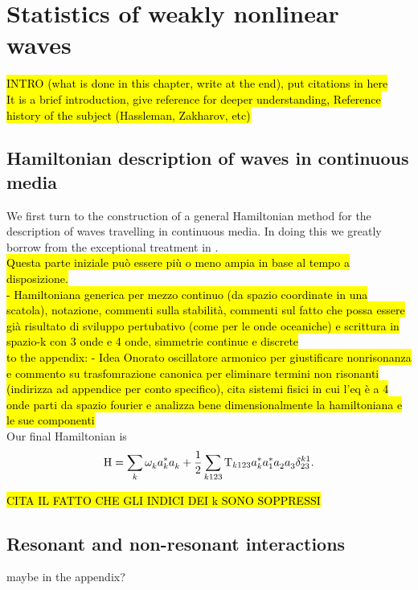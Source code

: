 \newpage
\phantom{}
\section{Statistics of weakly nonlinear waves}

\hl{INTRO (what is done in this chapter, write at the end), put citations in here \\
It is a brief introduction, give reference for deeper understanding, Reference history of the subject (Hassleman, Zakharov, etc)}


\subsection{Hamiltonian description of waves in continuous media}


We first turn to the construction of a general Hamiltonian method for the description of waves travelling in continuous media. In doing this
we greatly borrow from the exceptional treatment in \cite{Zakharov}. \\
\hl{Questa parte iniziale può essere più o meno ampia in base al tempo a disposizione. \\
- Hamiltoniana generica per mezzo continuo (da spazio coordinate in una scatola), notazione, commenti sulla stabilità, commenti sul fatto che possa essere
già risultato di sviluppo pertubativo (come per le onde oceaniche) e scrittura in spazio-k con 3 onde e 4 onde, simmetrie continue e discrete }\\

\hl{to the appendix: - Idea Onorato oscillatore armonico per giustificare nonrisonanza e commento su trasfomrazione canonica per eliminare termini 
non risonanti (indirizza ad appendice per conto specifico), cita sistemi fisici in cui l'eq è a 4 onde
parti da spazio fourier e analizza bene dimensionalmente la hamiltoniana e le sue componenti} \\

Our final Hamiltonian is 
\begin{equation}
    \mathrm{H} = \sum_k \omega^{}_k a_k^{*} a_k^{} + \frac{1}{2} \sum_{k123} \mathrm{T}_{k123} a_k^{*} a_1^{*} a_2^{} a_3^{} \delta_{23}^{k1}.
    \label{ham4}
\end{equation}

\hl{CITA IL FATTO CHE GLI INDICI DEI k SONO SOPPRESSI}
\subsection{Resonant and non-resonant interactions}
maybe in the appendix?

